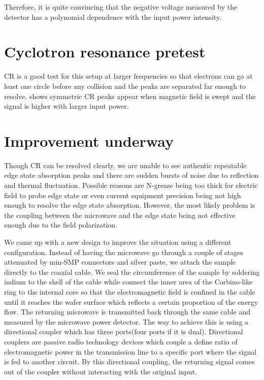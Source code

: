 \documentclass[12pt]{ruthesis}
\begin{document}
Therefore, it is quite convincing that the negative voltage measured by the detector has a polynomial dependence with the input power intensity.
 
 


 
 
\section{Cyclotron resonance pretest}\label{Cyclotron}

CR is a good test for this setup at larger frequencies so that electrons can go at least one circle before any collision and the peaks are separated far enough to resolve. 
 shows symmetric CR peaks appear when magnetic field is swept and the signal is higher with larger input power.  









\section{Improvement underway}\label{Improvement}

Though CR can be resolved clearly, we are unable to see authentic repeatable edge state absorption peaks
and there are sudden bursts of noise due to reflection and thermal fluctuation.
Possible reasons are N-grease being too thick for electric field to probe edge state or even current equipment precision being not high enough to resolve the edge state absorption. 
However, the most likely problem is the coupling between the microwave and the edge state being not effective enough due to the field polarization. 


We came up with a new design to improve the situation using a different configuration. 
Instead of having the microwave go through a couple of stages attenuated by min-SMP connectors and silver paste, we attach the sample directly to the coaxial cable.
We seal the circumference of the sample by soldering indium to the shell of the cable while connect the inner area of the Corbino-like ring to the internal core so that the electromagnetic field is confined in the cable until it reaches the wafer surface which reflects a certain proportion of the energy flow.  
The returning microwave is transmitted back through the same cable and measured by the microwave power detector.
The way to achieve this is using a directional coupler which has three ports(four ports if it is dual). 
Directional couplers are passive radio technology devices which couple a define ratio of electromagnetic power in the transmission line to a specific port where the signal is fed to another circuit. 
By this directional coupling, the returning signal comes out of the coupler without interacting with the original input.
\end{document}
